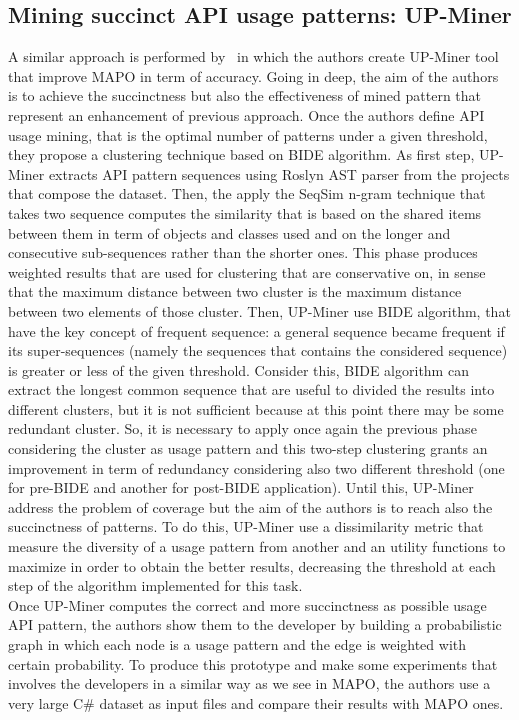 \subsection{Mining succinct API usage patterns: UP-Miner}
A similar approach is performed by~\cite{wang_mining_2013} in which the authors create UP-Miner tool that improve MAPO in term of accuracy. Going in deep, the aim of the authors is to achieve the succinctness but also the effectiveness of mined pattern that represent an enhancement of previous approach. Once the authors define API usage mining, that is the optimal number of patterns under a given threshold, they propose a clustering technique based on BIDE algorithm. As first step, UP-Miner extracts API pattern sequences using Roslyn AST parser from the projects that compose the dataset. Then, the apply the SeqSim n-gram technique that takes two sequence computes the similarity that is based on the shared items between them in term of objects and classes used and on the longer and consecutive sub-sequences rather than the shorter ones. This phase produces weighted results that are used for clustering that are conservative on, in sense that the maximum distance between two cluster is the maximum distance between two elements of those cluster.\newline
Then, UP-Miner use BIDE algorithm, that have the key concept of frequent sequence: a general sequence became frequent if its super-sequences (namely the sequences that contains the considered sequence) is greater or less of the given threshold. Consider this, BIDE algorithm can extract the longest common sequence that are useful to divided the results into different clusters, but it is not sufficient because at this point there may be some redundant cluster. So, it is necessary to apply once again the previous phase considering the cluster as usage pattern and this two-step clustering grants an improvement in term of redundancy considering also two different threshold (one for pre-BIDE and another for post-BIDE application). Until this, UP-Miner address the problem of coverage but the aim of the authors is to reach also the succinctness of patterns. To do this, UP-Miner use a dissimilarity metric that measure the diversity of a usage pattern from another and an utility functions to maximize in order to obtain the better results, decreasing the threshold at each step of the algorithm implemented for this task. \\
Once UP-Miner computes the correct and more succinctness as possible usage API pattern, the authors show them to the developer by building a probabilistic graph in which each node is a usage pattern and the edge is weighted with certain probability. To produce this prototype and make some experiments that involves the developers in a similar way as we see in MAPO, the authors use a very large C\# dataset as input files and compare their results with MAPO ones.

